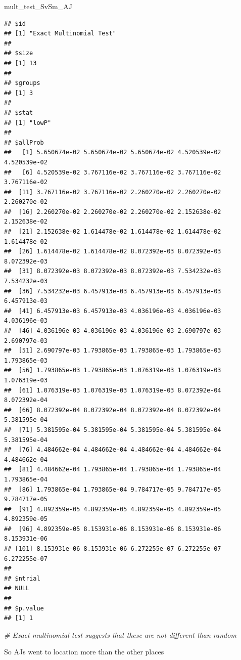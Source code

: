 \documentclass[]{article}
\newenvironment{Shaded}{\begin{snugshade}}{\end{snugshade}}
\newcommand{\CommentTok}[1]{\textcolor[rgb]{0.56,0.35,0.01}{\textit{{#1}}}}
\newcommand{\NormalTok}[1]{{#1}}
\begin{document}
\begin{Shaded}
\begin{Highlighting}[]
\NormalTok{mult_test_SvSm_AJ}
\end{Highlighting}
\end{Shaded}

\begin{verbatim}
## $id
## [1] "Exact Multinomial Test"
## 
## $size
## [1] 13
## 
## $groups
## [1] 3
## 
## $stat
## [1] "lowP"
## 
## $allProb
##   [1] 5.650674e-02 5.650674e-02 5.650674e-02 4.520539e-02 4.520539e-02
##   [6] 4.520539e-02 3.767116e-02 3.767116e-02 3.767116e-02 3.767116e-02
##  [11] 3.767116e-02 3.767116e-02 2.260270e-02 2.260270e-02 2.260270e-02
##  [16] 2.260270e-02 2.260270e-02 2.260270e-02 2.152638e-02 2.152638e-02
##  [21] 2.152638e-02 1.614478e-02 1.614478e-02 1.614478e-02 1.614478e-02
##  [26] 1.614478e-02 1.614478e-02 8.072392e-03 8.072392e-03 8.072392e-03
##  [31] 8.072392e-03 8.072392e-03 8.072392e-03 7.534232e-03 7.534232e-03
##  [36] 7.534232e-03 6.457913e-03 6.457913e-03 6.457913e-03 6.457913e-03
##  [41] 6.457913e-03 6.457913e-03 4.036196e-03 4.036196e-03 4.036196e-03
##  [46] 4.036196e-03 4.036196e-03 4.036196e-03 2.690797e-03 2.690797e-03
##  [51] 2.690797e-03 1.793865e-03 1.793865e-03 1.793865e-03 1.793865e-03
##  [56] 1.793865e-03 1.793865e-03 1.076319e-03 1.076319e-03 1.076319e-03
##  [61] 1.076319e-03 1.076319e-03 1.076319e-03 8.072392e-04 8.072392e-04
##  [66] 8.072392e-04 8.072392e-04 8.072392e-04 8.072392e-04 5.381595e-04
##  [71] 5.381595e-04 5.381595e-04 5.381595e-04 5.381595e-04 5.381595e-04
##  [76] 4.484662e-04 4.484662e-04 4.484662e-04 4.484662e-04 4.484662e-04
##  [81] 4.484662e-04 1.793865e-04 1.793865e-04 1.793865e-04 1.793865e-04
##  [86] 1.793865e-04 1.793865e-04 9.784717e-05 9.784717e-05 9.784717e-05
##  [91] 4.892359e-05 4.892359e-05 4.892359e-05 4.892359e-05 4.892359e-05
##  [96] 4.892359e-05 8.153931e-06 8.153931e-06 8.153931e-06 8.153931e-06
## [101] 8.153931e-06 8.153931e-06 6.272255e-07 6.272255e-07 6.272255e-07
## 
## $ntrial
## NULL
## 
## $p.value
## [1] 1
\end{verbatim}

\begin{Shaded}
\begin{Highlighting}[]
\CommentTok{# Exact multinomial test suggests that these are not different than random}
\end{Highlighting}
\end{Shaded}

So AJs went to location more than the other places
\end{document}
